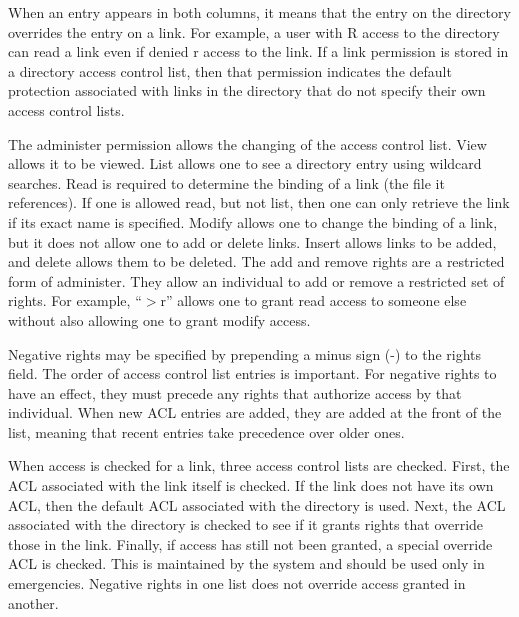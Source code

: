 When an entry appears in both columns, it means that the entry on the
directory overrides the entry on a link.  For example, a user with R
access to the directory can read a link even if denied r access to the
link.  If a link permission is stored in a directory access control
list, then that permission indicates the default protection associated
with links in the directory that do not specify their own access
control lists.

The administer permission allows the changing of the access control
list.  View allows it to be viewed.  List allows one to see a
directory entry using wildcard searches.  Read is required to
determine the binding of a link (the file it references).  If one is
allowed read, but not list, then one can only retrieve the link if its
exact name is specified.  Modify allows one to change the binding of a
link, but it does not allow one to add or delete links.  Insert allows
links to be added, and delete allows them to be deleted.  The add and
remove rights are a restricted form of administer.  They allow an
individual to add or remove a restricted set of rights.  For example,
``\(>\)r'' allows one to grant read access to someone else without
also allowing one to grant modify access.

Negative rights may be specified by prepending a minus sign (-) to the
rights field.  The order of access control list entries is important.
For negative rights to have an effect, they must precede any rights
that authorize access by that individual.  When new ACL entries are
added, they are added at the front of the list, meaning that recent
entries take precedence over older ones.

When access is checked for a link, three access control lists are
checked.  First, the ACL associated with the link itself is checked.
If the link does not have its own ACL, then the default ACL associated
with the directory is used. Next, the ACL associated with the
directory is checked to see if it grants rights that override those in
the link.  Finally, if access has still not been granted, a special
override ACL is checked.  This is maintained by the system and should
be used only in emergencies.  Negative rights in one list does not
override access granted in another.

